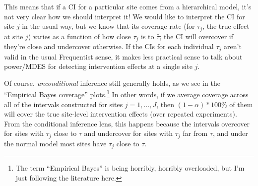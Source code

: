 \documentclass[]{article}
\begin{document}
This means that if a CI for a particular site comes from a hierarchical model, it's not very clear how we should interpret it!
We would like to interpret the CI for site $j$ in the usual way, but we know that its coverage rate (for $\tau_j$, the true effect at site $j$) varies as a function of how close $\tau_j$ is to $\hat{\tau}$; the CI will overcover if they're close and undercover otherwise.
If the CIs for each individual $\tau_j$ aren't valid in the usual Frequentist sense, it makes less practical sense to talk about power/MDES for detecting intervention effects at a single site $j$.

Of course, \textit{unconditional} inference still generally holds, as we see in the ``Empirical Bayes coverage'' plots.\footnote{The term ``Empirical Bayes'' is being horribly, horribly overloaded, but I'm just following the literature here.}
In other words, if we average coverage across all of the intervals constructed for sites $j = 1, \dots, J$, then $(1-\alpha)*100$\% of them will cover the true site-level intervention effects (over repeated experiments).
From the conditional inference lens, this happens because the intervals overcover for sites with $\tau_j$ close to $\tau$ and undercover for sites with $\tau_j$ far from $\tau$, and under the normal model most sites have $\tau_j$ close to $\tau$.
\end{document}
